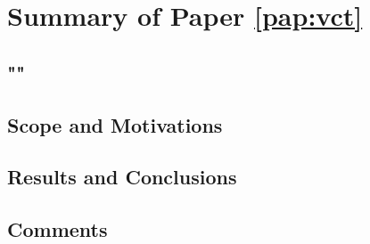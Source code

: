 \section{Summary of Paper \ref{pap:vct}}
\subsection*{""}
\subsection*{Scope and Motivations}

\subsection*{Results and Conclusions}
\subsection*{Comments}
\clearpage